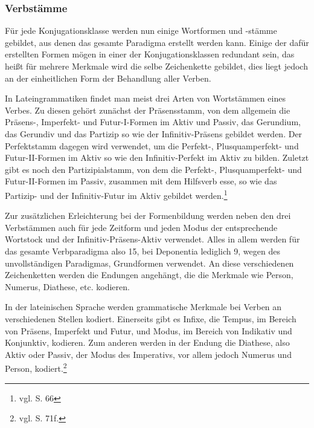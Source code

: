 \subsubsection{Verbstämme}
Für jede Konjugationsklasse werden nun einige Wortformen und -stämme gebildet, aus denen das gesamte Paradigma erstellt werden kann. Einige der dafür erstellten Formen mögen in einer der Konjugationsklassen redundant sein, das heißt für mehrere Merkmale wird die selbe Zeichenkette gebildet, dies liegt jedoch an der einheitlichen Form der Behandlung aller Verben. \par
In Lateingrammatiken findet man meist drei Arten von Wortstämmen eines Verbes. Zu diesen gehört zunächst der Präsensstamm, von dem allgemein die Präsens-, Imperfekt- und Futur-I-Formen im Aktiv und Passiv, das Gerundium, das Gerundiv und das Partizip so wie der Infinitiv-Präsens gebildet werden. Der Perfektstamm dagegen wird verwendet, um die Perfekt-, Plusquamperfekt- und Futur-II-Formen im Aktiv so wie den Infinitiv-Perfekt im Aktiv zu bilden. Zuletzt gibt es noch den Partizipialstamm, von dem die Perfekt-, Plusquamperfekt- und Futur-II-Formen im Passiv, zusammen mit dem Hilfsverb esse, so wie das Partizip- und der Infinitiv-Futur im Aktiv gebildet werden.\footnote{vgl. \cite{BAYER-LINDAUER1994} S. 66} \par
Zur zusätzlichen Erleichterung bei der Formenbildung werden neben den drei Verbstämmen auch für jede Zeitform und jeden Modus der entsprechende Wort\-stock und der Infinitiv-Präsens-Aktiv verwendet. Alles in allem werden für das gesamte Verbparadigma also 15, bei Deponentia lediglich 9, wegen des unvollständigen Paradigmas, Grundformen verwendet. An diese verschiedenen Zeichenketten werden die Endungen angehängt, die die Merkmale wie Person, Numerus, Diathese, etc. kodieren. \par
In der lateinischen Sprache werden grammatische Merkmale bei Verben an verschiedenen Stellen kodiert. Einerseits gibt es Infixe, die Tempus, im Bereich von Präsens, Imperfekt und Futur, und Modus, im Bereich von Indikativ und Konjunktiv, kodieren. Zum anderen werden in der Endung die Diathese, also Aktiv oder Passiv, der Modus des Imperativs, vor allem jedoch Numerus und Person, kodiert.\footnote{vgl. \cite{BAYER-LINDAUER1994} S. 71f.} \par
